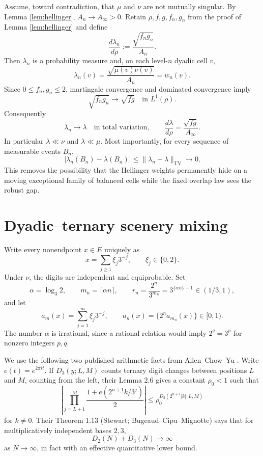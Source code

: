 \documentclass[11pt]{article}
\theoremstyle{remark}
\newcommand{\TV}{\mathrm{TV}}
\begin{document}
Assume, toward contradiction, that $\mu$ and $\nu$ are not mutually singular.  By Lemma \ref{lem:hellinger}, $A_n\to A_\infty>0$.  Retain $\rho,f,g,f_n,g_n$ from the proof of Lemma \ref{lem:hellinger} and define
\begin{equation}\label{eq:lambda-n}
 \frac{d\lambda_n}{d\rho}:=\frac{\sqrt{f_ng_n}}{A_n}.
\end{equation}
Then $\lambda_n$ is a probability measure and, on each level-$n$ dyadic cell $v$,
\begin{equation}\label{eq:lambda-weight}
 \lambda_n(v)=\frac{\sqrt{\mu(v)\nu(v)}}{A_n}=w_n(v).
\end{equation}
Since $0\le f_n,g_n\le2$, martingale convergence and dominated convergence imply
\[
 \sqrt{f_ng_n}\longrightarrow\sqrt{fg}\quad\text{in }L^1(\rho).
\]
Consequently
\begin{equation}\label{eq:tv}
 \lambda_n\longrightarrow\lambda\quad\text{in total variation},
 \qquad
 \frac{d\lambda}{d\rho}=\frac{\sqrt{fg}}{A_\infty}.
\end{equation}
In particular $\lambda\ll\nu$ and $\lambda\ll\mu$.  Most importantly, for every sequence of measurable events $B_n$,
\begin{equation}\label{eq:varying}
 |\lambda_n(B_n)-\lambda(B_n)|
 \le \|\lambda_n-\lambda\|_{\TV}\longrightarrow0.
\end{equation}
This removes the possibility that the Hellinger weights permanently hide on a moving exceptional family of balanced cells while the fixed overlap law sees the robust gap.

\section{Dyadic--ternary scenery mixing}

Write every nonendpoint $x\in E$ uniquely as
\[
 x=\sum_{j\ge1}\xi_j3^{-j},\qquad \xi_j\in\{0,2\}.
\]
Under $\nu$, the digits are independent and equiprobable.  Set
\[
 \alpha=\log_3 2,\qquad
 m_n=\lceil\alpha n\rceil,\qquad
 r_n=\frac{2^n}{3^{m_n}}=3^{\{\alpha n\}-1}\in(1/3,1),
\]
and let
\[
 a_m(x)=\sum_{j=1}^m\xi_j3^{-j},
 \qquad
 u_n(x)=\{2^n a_{m_n}(x)\}\in[0,1).
\]
The number $\alpha$ is irrational, since a rational relation would imply $2^q=3^p$ for nonzero integers $p,q$.

We use the following two published arithmetic facts from Allen--Chow--Yu \cite{ACY}.  Write $e(t)=e^{2\pi it}$.  If $D_3(y;L,M)$ counts ternary digit changes between positions $L$ and $M$, counting from the left, their Lemma 2.6 gives a constant $\rho_0<1$ such that
\begin{equation}\label{eq:ACY-product}
 \left|\prod_{j=L+1}^M\frac{1+e(2^{n+1}k/3^j)}2\right|
 \le \rho_0^{D_3(2^{n+1}|k|;L,M)}
\end{equation}
for $k\ne0$.  Their Theorem 1.13 (Stewart; Bugeaud--Cipu--Mignotte) says that for multiplicatively independent bases $2,3$,
\begin{equation}\label{eq:digit-change}
 D_2(N)+D_3(N)\longrightarrow\infty
\end{equation}
as $N\to\infty$, in fact with an effective quantitative lower bound.
\end{document}
